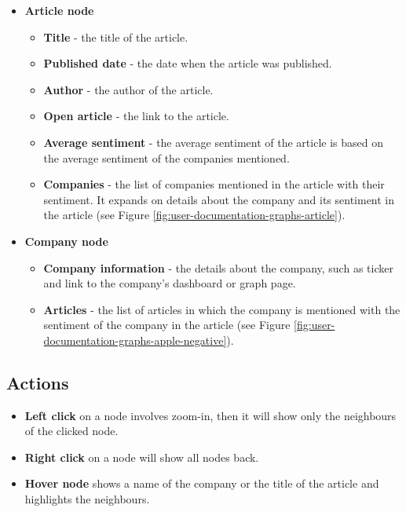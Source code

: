 \begin{itemize}
    \item \textbf{Article node}
    \begin{itemize}
        \item \textbf{Title} - the title of the article.
        \item \textbf{Published date} - the date when the article was published.
        \item \textbf{Author} - the author of the article.
        \item \textbf{Open article} - the link to the article.
        \item \textbf{Average sentiment} - the average sentiment of the article is based on the average sentiment of the companies mentioned.
        \item \textbf{Companies} - the list of companies mentioned in the article with their sentiment. It expands on details about the company and its sentiment in the article (see Figure \ref{fig:user-documentation-graphs-article}).
    \end{itemize}
    \item \textbf{Company node}
    \begin{itemize}
        \item \textbf{Company information} - the details about the company, such as ticker and link to the company's dashboard or graph page.
        \item \textbf{Articles} - the list of articles in which the company is mentioned with the sentiment of the company in the article (see Figure \ref{fig:user-documentation-graphs-apple-negative}).
    \end{itemize}
\end{itemize}

\subsection{Actions}
\label{subsec:actions}
\begin{itemize}
    \item \textbf{Left click} on a node involves zoom-in, then it will show only the neighbours of the clicked node.
    \item \textbf{Right click} on a node will show all nodes back.
    \item \textbf{Hover node} shows a name of the company or the title of the article and highlights the neighbours.
\end{itemize}

